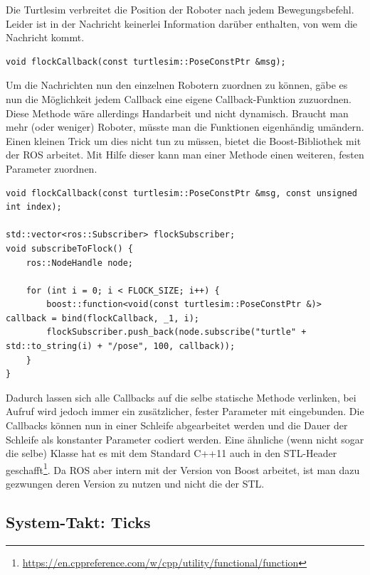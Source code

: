 Die Turtlesim verbreitet die Position der Roboter nach jedem Bewegungsbefehl. Leider ist in der Nachricht  keinerlei Information darüber enthalten, von wem die Nachricht kommt.

\begin{lstlisting}[style=cpp, title=Callback-Funktion für Pose.msg]
void flockCallback(const turtlesim::PoseConstPtr &msg);
\end{lstlisting}

Um die Nachrichten nun den einzelnen Robotern zuordnen zu können, gäbe es nun die Möglichkeit jedem Callback eine eigene Callback-Funktion zuzuordnen. Diese Methode wäre allerdings Handarbeit und nicht dynamisch. Braucht man mehr (oder weniger) Roboter, müsste man die Funktionen eigenhändig umändern.
Einen kleinen Trick um dies nicht tun zu müssen, bietet die Boost-Bibliothek mit der ROS arbeitet. Mit Hilfe dieser kann man einer Methode einen weiteren, festen Parameter zuordnen.

\begin{lstlisting}[style=cpp, title=Callback-Funktion für Pose.msg mit Boost]
void flockCallback(const turtlesim::PoseConstPtr &msg, const unsigned int index);

std::vector<ros::Subscriber> flockSubscriber;
void subscribeToFlock() {
    ros::NodeHandle node;

    for (int i = 0; i < FLOCK_SIZE; i++) {
        boost::function<void(const turtlesim::PoseConstPtr &)> callback = bind(flockCallback, _1, i);
        flockSubscriber.push_back(node.subscribe("turtle" + std::to_string(i) + "/pose", 100, callback));
    }
}
\end{lstlisting}

Dadurch lassen sich alle Callbacks auf die selbe statische Methode verlinken, bei Aufruf wird jedoch immer ein zusätzlicher, fester Parameter mit eingebunden. Die Callbacks können nun in einer Schleife abgearbeitet werden und die Dauer der Schleife als konstanter Parameter codiert werden.
Eine ähnliche (wenn nicht sogar die selbe) Klasse hat es mit dem Standard C++11 auch in den STL-Header  geschafft\footnote{\url{https://en.cppreference.com/w/cpp/utility/functional/function}}. Da ROS aber intern mit der Version von Boost arbeitet, ist man dazu gezwungen deren Version zu nutzen und nicht die der STL.

\subsection*{System-Takt: Ticks}

